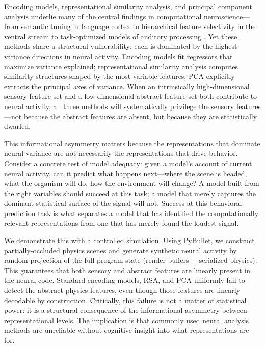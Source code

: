 \documentclass{ccn}
\begin{document}
Encoding models, representational similarity analysis, and principal
component analysis underlie many of the central findings in
computational neuroscience---from semantic tuning in language cortex to
hierarchical feature selectivity in the ventral stream to
task-optimized models of auditory processing
\citep{huth2016natural,yamins2014performance,kriegeskorte2008representational,kay2008identifying,naselaris2011encoding,kell2018task}.
Yet these methods share a structural vulnerability: each is dominated
by the highest-variance directions in neural activity. Encoding models
fit regressors that maximize variance explained; representational
similarity analysis computes similarity structures shaped by the most
variable features; PCA explicitly extracts the principal axes of
variance. When an intrinsically high-dimensional sensory feature set
and a low-dimensional abstract feature set both contribute to neural
activity, all three methods will systematically privilege the sensory
features---not because the abstract features are absent, but because
they are statistically dwarfed.

This informational asymmetry matters because the representations that
dominate neural variance are not necessarily the representations that
drive behavior. Consider a concrete test of model adequacy: given a
model's account of current neural activity, can it predict what happens
next---where the scene is headed, what the organism will do, how the
environment will change? A model built from the right variables should
succeed at this task; a model that merely captures the dominant
statistical surface of the signal will not. Success at this behavioral
prediction task is what separates a model that has identified the
computationally relevant representations from one that has merely
found the loudest signal.

We demonstrate this with a controlled simulation. Using PyBullet, we
construct partially-occluded physics scenes and generate synthetic
neural activity by random projection of the full program state (render
buffers $+$ serialized physics). This guarantees that both sensory and
abstract features are linearly present in the neural code. Standard
encoding models, RSA, and PCA uniformly fail to detect the abstract
physics features, even though those features are linearly decodable by
construction. Critically, this failure is not a matter of statistical
power: it is a structural consequence of the informational asymmetry
between representational levels. The implication is that commonly used
neural analysis methods are unreliable without cognitive insight into
what representations are for.
\end{document}
